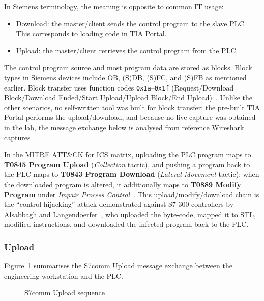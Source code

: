 ﻿\documentclass[../main.tex]{subfiles}
\begin{document}
In Siemens terminology, the meaning is opposite to common IT usage:


\begin{itemize}
    \item Download: the master/client sends the control program to the slave PLC. This corresponds to loading code in TIA Portal.
\end{itemize}


\begin{itemize}
    \item Upload: the master/client retrieves the control program from the PLC.
\end{itemize}


The control program source and most program data are stored as blocks. Block types in Siemens devices include OB, (S)DB, (S)FC, and (S)FB as mentioned earlier. Block transfer uses function codes \texttt{0x1a}--\texttt{0x1f} (Request/Download Block/Download Ended/Start Upload/Upload Block/End Upload)~\cite{gmiru_s7comm_part2}. Unlike the other scenarios, no self-written tool was built for block transfer: the pre-built TIA Portal performs the upload/download, and because no live capture was obtained in the lab, the message exchange below is analysed from reference Wireshark captures~\cite{wireshark_s7comm}.

In the MITRE ATT\&CK for ICS matrix, uploading the PLC program maps to \textbf{T0845 Program Upload} (\emph{Collection} tactic), and pushing a program back to the PLC maps to \textbf{T0843 Program Download} (\emph{Lateral Movement} tactic); when the downloaded program is altered, it additionally maps to \textbf{T0889 Modify Program} under \emph{Impair Process Control}~\cite{mitre_ics_attack}. This upload/modify/download chain is the ``control hijacking'' attack demonstrated against S7-300 controllers by Alsabbagh and Langendoerfer~\cite{alsabbagh2022remote}, who uploaded the byte-code, mapped it to STL, modified instructions, and downloaded the infected program back to the PLC.



\subsubsection{Upload}



Figure~\ref{fig:s7-upload-sequence} summarises the S7comm Upload message exchange between the engineering workstation and the PLC.

\begin{figure}[htbp]
    \centering
    \SSevenUploadSequence
    \caption{S7comm Upload sequence}
    \label{fig:s7-upload-sequence}
\end{figure}
\end{document}
